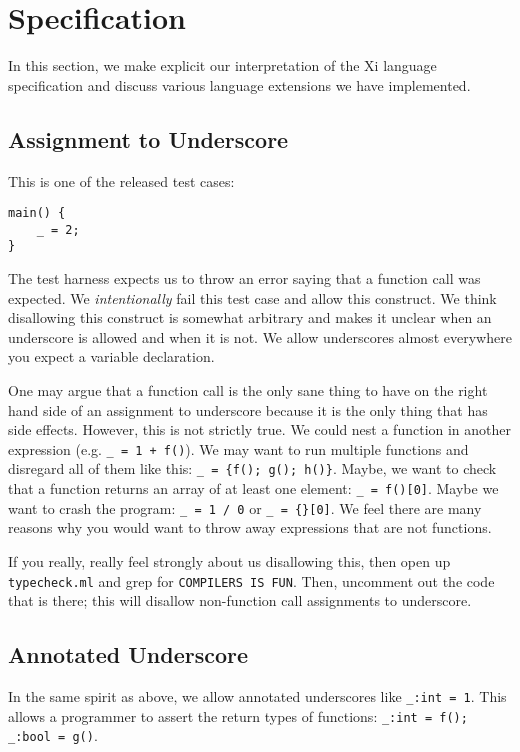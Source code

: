 \documentclass{hw}
\begin{document}
\section{Specification}\label{sec:specification}
In this section, we make explicit our interpretation of the Xi language
specification and discuss various language extensions we have implemented.

\subsection{Assignment to Underscore}
This is one of the released test cases:
%
\begin{verbatim}
main() {
    _ = 2;
}
\end{verbatim}
%
The test harness expects us to throw an error saying that a function call was
expected. We \emph{intentionally} fail this test case and allow this construct.
We think disallowing this construct is somewhat arbitrary and makes it unclear
when an underscore is allowed and when it is not. We allow underscores almost
everywhere you expect a variable declaration.

One may argue that a function call is the only sane thing to have on the right
hand side of an assignment to underscore because it is the only thing that has
side effects. However, this is not strictly true. We could nest a function in
another expression (e.g. \texttt{\_ = 1 + f()}). We may want to run multiple
functions and disregard all of them like this: \texttt{\_ = \{f(); g(); h()\}}.
Maybe, we want to check that a function returns an array of at least one
element: \texttt{\_ = f()[0]}. Maybe we want to crash the program: \texttt{\_ = 1
/ 0} or \texttt{\_ = \{\}[0]}. We feel there are many reasons why you would want
to throw away expressions that are not functions.

If you really, really feel strongly about us disallowing this, then open up
\texttt{typecheck.ml} and grep for \texttt{COMPILERS IS FUN}. Then, uncomment
out the code that is there; this will disallow non-function call assignments to
underscore.

\subsection{Annotated Underscore}
In the same spirit as above, we allow annotated underscores like \texttt{\_:int
= 1}. This allows a programmer to assert the return types of functions:
\texttt{\_:int = f(); \_:bool = g()}.
\end{document}
